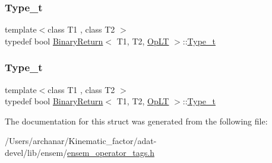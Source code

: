 \mbox{\label{structBinaryReturn_3_01T1_00_01T2_00_01OpLT_01_4_a81d2cdfa9ce7378eebb7619141857f6d}} 
\subsubsection{\texorpdfstring{Type\_t}{Type\_t}\hspace{0.1cm}{\footnotesize\ttfamily [2/3]}}
{\footnotesize\ttfamily template$<$class T1 , class T2 $>$ \\
typedef bool \mbox{\hyperlink{structBinaryReturn}{Binary\+Return}}$<$ T1, T2, \mbox{\hyperlink{structOpLT}{Op\+LT}} $>$\+::\mbox{\hyperlink{structBinaryReturn_3_01T1_00_01T2_00_01OpLT_01_4_a81d2cdfa9ce7378eebb7619141857f6d}{Type\+\_\+t}}}

\mbox{\label{structBinaryReturn_3_01T1_00_01T2_00_01OpLT_01_4_a81d2cdfa9ce7378eebb7619141857f6d}} 
\subsubsection{\texorpdfstring{Type\_t}{Type\_t}\hspace{0.1cm}{\footnotesize\ttfamily [3/3]}}
{\footnotesize\ttfamily template$<$class T1 , class T2 $>$ \\
typedef bool \mbox{\hyperlink{structBinaryReturn}{Binary\+Return}}$<$ T1, T2, \mbox{\hyperlink{structOpLT}{Op\+LT}} $>$\+::\mbox{\hyperlink{structBinaryReturn_3_01T1_00_01T2_00_01OpLT_01_4_a81d2cdfa9ce7378eebb7619141857f6d}{Type\+\_\+t}}}



The documentation for this struct was generated from the following file\+:\begin{DoxyCompactItemize}
\item 
/\+Users/archanar/\+Kinematic\+\_\+factor/adat-\/devel/lib/ensem/\mbox{\hyperlink{adat-devel_2lib_2ensem_2ensem__operator__tags_8h}{ensem\+\_\+operator\+\_\+tags.\+h}}\end{DoxyCompactItemize}
